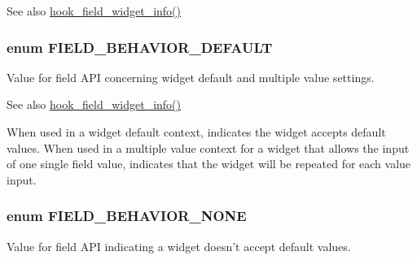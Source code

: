\begin{DoxySeeAlso}{See also}
\hyperlink{group__field__widget_gac53aa6c2a4ac1215660d25b5d7f20792}{hook\_\-field\_\-widget\_\-info()} 
\end{DoxySeeAlso}
\hypertarget{group__field_ga9549af1a8f86107fbafc0e3425ec7629}{
\subsubsection[{FIELD\_\-BEHAVIOR\_\-DEFAULT}]{\setlength{\rightskip}{0pt plus 5cm}enum {\bf FIELD\_\-BEHAVIOR\_\-DEFAULT}}}
\label{group__field_ga9549af1a8f86107fbafc0e3425ec7629}
Value for field API concerning widget default and multiple value settings.

\begin{DoxySeeAlso}{See also}
\hyperlink{group__field__widget_gac53aa6c2a4ac1215660d25b5d7f20792}{hook\_\-field\_\-widget\_\-info()}
\end{DoxySeeAlso}
When used in a widget default context, indicates the widget accepts default values. When used in a multiple value context for a widget that allows the input of one single field value, indicates that the widget will be repeated for each value input. \hypertarget{group__field_gabff95904b186d355153ceda1f3941975}{
\subsubsection[{FIELD\_\-BEHAVIOR\_\-NONE}]{\setlength{\rightskip}{0pt plus 5cm}enum {\bf FIELD\_\-BEHAVIOR\_\-NONE}}}
\label{group__field_gabff95904b186d355153ceda1f3941975}
Value for field API indicating a widget doesn't accept default values.

